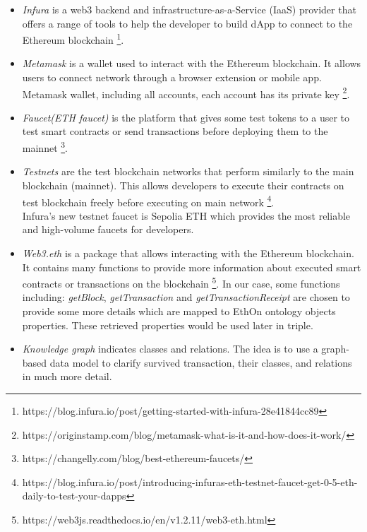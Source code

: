 \begin{itemize}
\item \textit{Infura} is a web3 backend and infrastructure-as-a-Service (IaaS) provider that offers a range of tools to help the developer to build dApp to connect to the Ethereum blockchain \footnote{https://blog.infura.io/post/getting-started-with-infura-28e41844cc89}.\\
\item \textit{Metamask} is a wallet used to interact with the Ethereum blockchain. It allows users to connect network through a browser extension or mobile app. Metamask wallet, including all accounts, each account has its private key \footnote{https://originstamp.com/blog/metamask-what-is-it-and-how-does-it-work/}.\\
\item \textit{Faucet(ETH faucet)} is the platform that gives some test tokens to a user to test smart contracts or send transactions before deploying them to the mainnet \footnote{https://changelly.com/blog/best-ethereum-faucets/}. \\
\item \textit{Testnets} are the test blockchain networks that perform similarly to the main blockchain (mainnet). This allows developers to execute their contracts on test blockchain freely before executing on main network \footnote{https://blog.infura.io/post/introducing-infuras-eth-testnet-faucet-get-0-5-eth-daily-to-test-your-dapps}.\\
Infura's new testnet faucet is Sepolia ETH which provides the most reliable and high-volume faucets for developers. \\
\item \textit{Web3.eth} is a package that allows interacting with the Ethereum blockchain. It contains many functions to provide more information about executed smart contracts or transactions on the blockchain \footnote{https://web3js.readthedocs.io/en/v1.2.11/web3-eth.html}. 
In our case, some functions including: \textit{getBlock}, \textit{getTransaction} and \textit{getTransactionReceipt} are chosen to provide some more details which are mapped to EthOn ontology objects properties. These retrieved properties would be used later in triple.\\
\item \textit{Knowledge graph} indicates classes and relations.
The idea is to use a graph-based data model to clarify survived transaction, their classes, and relations in much more detail. 
\begin{center}
	

\end{center}
\end{itemize}
